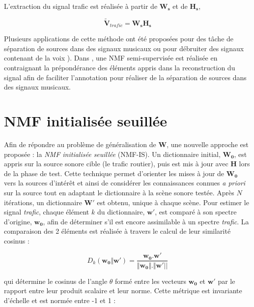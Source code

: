 L'extraction du signal trafic est réalisée à partir de $\mathbf{W_s}$ et de $\mathbf{H_s}$,

\begin{equation}
\mathbf{\tilde{V}}_{trafic} = \mathbf{W_s H_s}
\end{equation}

Plusieurs applications de cette méthode ont été proposées pour des tâche de séparation de sources dans des signaux musicaux \cite{smaragdis2007supervised} ou pour débruiter des signaux contenant de la voix \cite{mysore2011non, duan2012online}). Dans \cite{lefevre2012semi}, une NMF semi-supervisée est réalisée en contraignant la prépondérance des éléments appris dans la reconstruction du signal afin de faciliter l'annotation pour réaliser de la séparation de sources dans des signaux musicaux.


\section{NMF initialisée seuillée}\label{sec:NMF_TI}

Afin de répondre au problème de généralisation de $\mathbf{W}$, une nouvelle approche est proposée : la \textit{NMF initialisée seuillée} (NMF-IS). Un dictionnaire initial, $\mathbf{W_0}$, est appris sur la source sonore cible (le trafic routier), puis est mis à jour avec $\mathbf{H}$ lors de la phase de test.
Cette technique permet d'orienter les mises à jour de $\mathbf{W_0}$ vers la sources d'intérêt et ainsi de considérer les connaissances connues \textit{a priori} sur la source tout en adaptant le dictionnaire à la scène sonore testée. Après $N$ itérations, un dictionnaire $\mathbf{W'}$ est obtenu, unique à chaque scène. Pour estimer le signal \textit{trafic}, chaque élément $k$ du dictionnaire, $\mathbf{w'}$, est comparé à son spectre d'origine, $\mathbf{w_0}$, afin de déterminer s'il est encore assimilable à un spectre \textit{trafic}. La comparaison des 2 éléments est réalisée à travers le calcul de leur similarité cosinus :

\begin{equation}\label{eq:similarite_cosinus}
 D_{k}(\mathbf{w_0}\Vert\mathbf{w'}) = \frac{\mathbf{w_0}.\mathbf{w'}}{\Vert\mathbf{w_0}  \Vert. \Vert\mathbf{w'} \vert \vert}
\end{equation}

qui détermine le cosinus de l'angle $\theta$ formé entre les vecteurs $\mathbf{w_0}$ et $\mathbf{w'}$ par le rapport entre leur produit scalaire et leur norme. Cette métrique est invariante d'échelle et est normée entre -1 et 1 :

